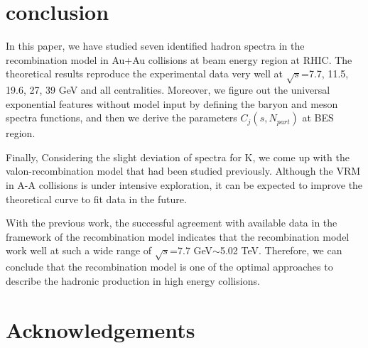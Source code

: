 \documentclass[twocolumn,aps,superscriptaddress,showpacs,nofootinbib,floatfix]{revtex4}
\begin{document}
\section{conclusion}\label{summary7}
In this paper, we have studied seven identified hadron spectra in the recombination model in Au+Au collisions at beam energy region at RHIC. The theoretical results reproduce the experimental data very well at $\sqrt{s}$=7.7, 11.5, 19.6, 27, 39 GeV and all centralities. Moreover, we figure out the universal exponential features without model input by defining the baryon and meson spectra functions, and then we derive the parameters $C_j(s,N_{part})$ at BES region.

Finally, Considering the slight deviation of spectra for K, we come up with the valon-recombination model that had been studied previously. Although the VRM in A-A collisions is under intensive exploration, it can be expected to improve the theoretical curve to fit data in the future.

With the previous work\cite{3c,4u}, the successful agreement with available data in the framework of the recombination model indicates that the recombination model work well at such a wide range of $\sqrt{s}$=7.7 GeV$\sim$5.02 TeV. Therefore, we can conclude that the recombination model is one of the optimal approaches to describe the hadronic production in high energy collisions.


\section*{Acknowledgements}
\end{document}
